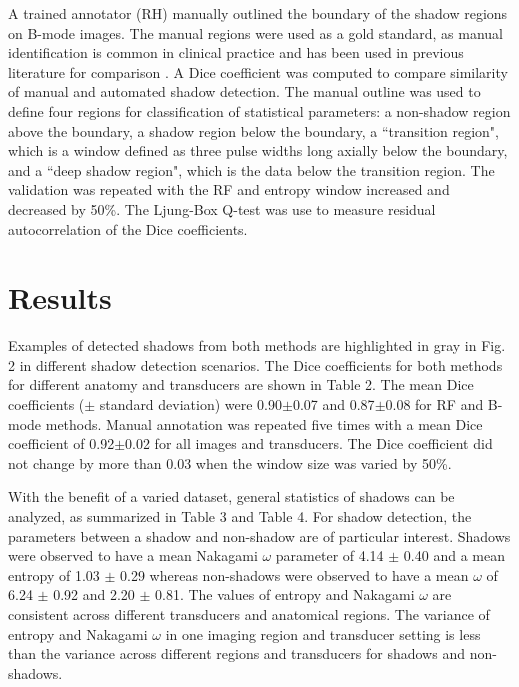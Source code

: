 \documentclass[authoryear,preprint,review,12pt]{elsarticle}
\begin{document}
A trained annotator (RH) manually outlined the boundary of the shadow regions on B-mode images. The manual regions were used as a gold standard, as manual identification is common in clinical practice and has been used in previous literature for comparison \citep{Hellier2010}. A Dice coefficient was computed to compare similarity of manual and automated shadow detection. The manual outline was used to define four regions for classification of statistical parameters: a non-shadow region above the boundary, a shadow region below the boundary, a ``transition region", which is a window defined as three pulse widths long axially below the boundary, and a ``deep shadow region", which is the data below the transition region. The validation was repeated with the RF and entropy window increased and decreased by 50\%. The Ljung-Box Q-test was use to measure residual autocorrelation of the Dice coefficients.
%
\section*{Results}
\label{Results}
Examples of detected shadows from both methods are highlighted in gray in Fig. 2 in different shadow detection scenarios. The Dice coefficients for both methods for different anatomy and transducers are shown in Table 2. The mean Dice coefficients ($\pm$ standard deviation) were 0.90$\pm$0.07 and 0.87$\pm$0.08 for RF and B-mode methods. Manual annotation was repeated five times with a mean Dice coefficient of 0.92$\pm$0.02 for all images and transducers. The Dice coefficient did not change by more than 0.03 when the window size was varied by 50\%.

With the benefit of a varied dataset, general statistics of shadows can be analyzed, as summarized in Table 3 and Table 4. For shadow detection, the parameters between a shadow and non-shadow are of particular interest. Shadows were observed to have a mean Nakagami $\omega$ parameter of 4.14 $\pm$ 0.40 and a mean entropy of 1.03 $\pm$ 0.29 whereas non-shadows were observed to have a mean $\omega$ of 6.24 $\pm$ 0.92 and 2.20 $\pm$ 0.81. The values of entropy and Nakagami $\omega$ are consistent across different transducers and anatomical regions. The variance of entropy and Nakagami $\omega$ in one imaging region and transducer setting is less than the variance across different regions and transducers for shadows and non-shadows. 


\end{document}
